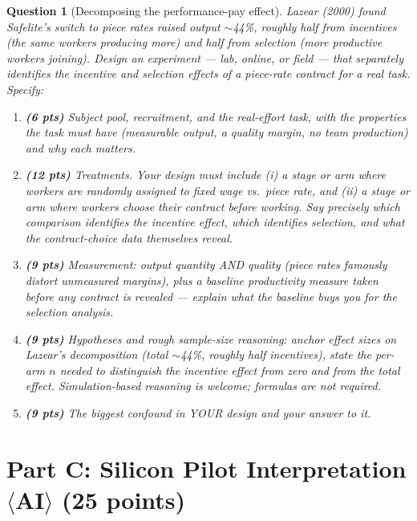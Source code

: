 \documentclass[11pt]{article}
\newtheorem{question}{Question}
\begin{document}
\begin{question}[Decomposing the performance-pay effect]
Lazear (2000) found Safelite's switch to piece rates raised output
$\sim$44\%, roughly half from incentives (the same workers producing
more) and half from selection (more productive workers joining). Design
an experiment --- lab, online, or field --- that separately identifies
the incentive and selection effects of a piece-rate contract for a real
task. Specify:
\begin{enumerate}[label=(\alph*)]
  \item \textbf{(6 pts)} Subject pool, recruitment, and the real-effort
        task, with the properties the task must have (measurable output,
        a quality margin, no team production) and why each matters.
  \item \textbf{(12 pts)} Treatments. Your design must include (i) a
        stage or arm where workers are \emph{randomly assigned} to fixed
        wage vs.\ piece rate, and (ii) a stage or arm where workers
        \emph{choose} their contract before working. Say precisely which
        comparison identifies the incentive effect, which identifies
        selection, and what the contract-choice data themselves reveal.
  \item \textbf{(9 pts)} Measurement: output quantity AND quality (piece
        rates famously distort unmeasured margins), plus a baseline
        productivity measure taken \emph{before} any contract is
        revealed --- explain what the baseline buys you for the selection
        analysis.
  \item \textbf{(9 pts)} Hypotheses and rough sample-size reasoning:
        anchor effect sizes on Lazear's decomposition (total
        $\sim$44\%, roughly half incentives), state the per-arm $n$
        needed to distinguish the incentive effect from zero and from
        the total effect. Simulation-based reasoning is welcome;
        formulas are not required.
  \item \textbf{(9 pts)} The biggest confound in YOUR design and your
        answer to it.
\end{enumerate}
\end{question}

\section*{Part C: Silicon Pilot Interpretation $\langle$AI$\rangle$
(25 points)}
\end{document}
